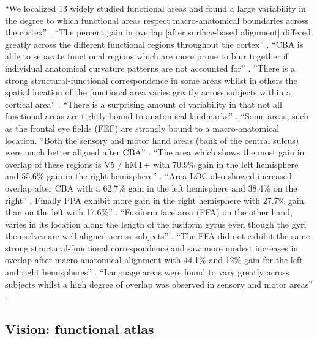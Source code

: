 %
``We localized 13 widely studied functional areas and found a large variability
in the degree to which functional areas respect macro-anatomical boundaries
across the cortex'' \citep{frost2012measuring}.
%
``The percent gain in overlap [after surface-based alignment] differed greatly
across the different functional regions throughout the cortex''
\citep{frost2012measuring}.
%
``CBA is able to separate functional regions which are more prone to blur
together if individual anatomical curvature patterns are not accounted for''
\citep{frost2012measuring}.
%
''There is a strong structural-functional correspondence in some areas whilst in
others the spatial location of the functional area varies greatly across
subjects within a cortical area'' \citep{frost2012measuring}.
%
``There is a surprising amount of variability in that not all functional areas
are tightly bound to anatomical landmarks'' \citep{frost2012measuring}.
%
``Some areas, such as the frontal eye fields (FEF) are strongly bound to a
macro-anatomical location.
%
``Both the sensory and motor hand areas (bank of the central sulcus) were much
better aligned after CBA'' \citep{frost2012measuring}.
%
``The area which shows the most gain in overlap of these regions is V5 / hMT+
with 70.9\% gain in the left hemisphere and 55.6\% gain in the right
hemisphere'' \citep{frost2012measuring}.
%
``Area LOC also showed increased overlap after CBA with a 62.7\% gain in the
left hemisphere and 38.4\% on the right'' \citep{frost2012measuring}.
%
Finally PPA exhibit more gain in the right hemisphere with 27.7\% gain, than on
the left with 17.6\%'' \citep{frost2012measuring}.
%
``Fusiform face area (FFA) on the other hand, varies in its location along the
length of the fusiform gyrus even though the gyri themselves are well aligned
across subjects'' \citep{frost2012measuring}.
%
``The FFA did not exhibit the same strong structural-functional correspondence
and saw more modest increases in overlap after macro-anatomical alignment with
44.1\% and 12\% gain for the left and right hemispheres''
\citep{frost2012measuring}.
%
``Language areas were found to vary greatly across subjects whilst a high degree
of overlap was observed in sensory and motor areas'' \citep{frost2012measuring}.



\subsection{Vision: functional atlas}


